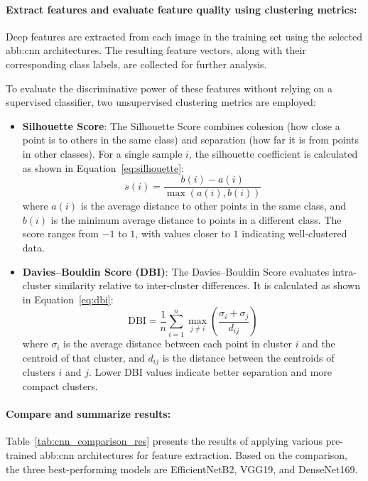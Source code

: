 \paragraph{Extract features and evaluate feature quality using clustering metrics:}  
Deep features are extracted from each image in the training set using the selected \gls{abb:cnn} architectures. The resulting feature vectors, along with their corresponding class labels, are collected for further analysis.

To evaluate the discriminative power of these features without relying on a supervised classifier, two unsupervised clustering metrics are employed:

\begin{itemize}
    \item \textbf{Silhouette Score}:  
    The Silhouette Score combines cohesion (how close a point is to others in the same class) and separation (how far it is from points in other classes). For a single sample $i$, the silhouette coefficient is calculated as shown in Equation~\ref{eq:silhouette}:
    \begin{equation}
        s(i) = \frac{b(i) - a(i)}{\max(a(i), b(i))}
        \label{eq:silhouette}
    \end{equation}
    where $a(i)$ is the average distance to other points in the same class, and $b(i)$ is the minimum average distance to points in a different class. The score ranges from $-1$ to $1$, with values closer to $1$ indicating well-clustered data.

    \item \textbf{Davies–Bouldin Score (DBI)}:  
    The Davies–Bouldin Score evaluates intra-cluster similarity relative to inter-cluster differences. It is calculated as shown in Equation~\ref{eq:dbi}:
    \begin{equation}
        \text{DBI} = \frac{1}{n} \sum_{i=1}^{n} \max_{j \neq i} \left( \frac{\sigma_i + \sigma_j}{d_{ij}} \right)
        \label{eq:dbi}
    \end{equation}
    where $\sigma_i$ is the average distance between each point in cluster $i$ and the centroid of that cluster, and $d_{ij}$ is the distance between the centroids of clusters $i$ and $j$. Lower DBI values indicate better separation and more compact clusters.
\end{itemize}


\paragraph{Compare and summarize results:}  
Table~\ref{tab:cnn_comparison_res} presents the results of applying various pre-trained \gls{abb:cnn} architectures for feature extraction. Based on the comparison, the three best-performing models are EfficientNetB2, VGG19, and DenseNet169.

